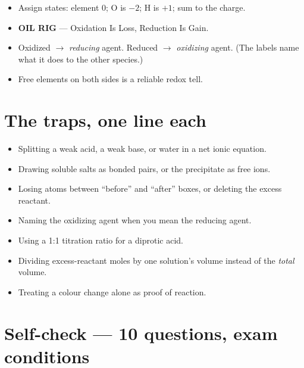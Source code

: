 \documentclass{apchem-worksheet}
\begin{document}
\begin{itemize}[leftmargin=*,itemsep=0.18em]
  \item Assign states: element 0; O is $-2$; H is $+1$; sum to the charge.
  \item \textbf{OIL RIG} --- Oxidation Is Loss, Reduction Is Gain.
  \item Oxidized $\to$ \emph{reducing} agent. Reduced $\to$
        \emph{oxidizing} agent. (The labels name what it does to the other
        species.)
  \item Free elements on both sides is a reliable redox tell.
\end{itemize}

\section*{\sffamily The traps, one line each}

\begin{itemize}[leftmargin=*,itemsep=0.22em]
  \item Splitting a weak acid, a weak base, or water in a net ionic
        equation.
  \item Drawing soluble salts as bonded pairs, or the precipitate as free
        ions.
  \item Losing atoms between ``before'' and ``after'' boxes, or deleting the
        excess reactant.
  \item Naming the oxidizing agent when you mean the reducing agent.
  \item Using a 1:1 titration ratio for a diprotic acid.
  \item Dividing excess-reactant moles by one solution's volume instead of
        the \emph{total} volume.
  \item Treating a colour change alone as proof of reaction.
\end{itemize}

\section*{\sffamily Self-check --- 10 questions, exam conditions}
\end{document}
